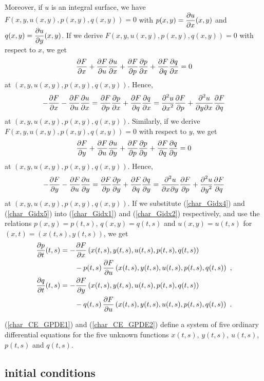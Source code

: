 Moreover, if $u$ is an integral surface, we have
$\displaystyle F\left(x,y,u(x,y),p(x,y),q(x,y)\right) = 0$ with
$\displaystyle p(x,y) = \pdydx{u}{x}(x,y)$ and
$\displaystyle q(x,y) = \pdydx{u}{y}(x,y)$.  If we derive
$\displaystyle F\left(x,y,u(x,y),p(x,y),q(x,y)\right) = 0$ 
with respect to $x$, we get
\[
\pdydx{F}{x} + \pdydx{F}{u}\pdydx{u}{x} + \pdydx{F}{p}\pdydx{p}{x}
+ \pdydx{F}{q} \pdydx{q}{x} = 0
\]
at $(x,y,u(x,y),p(x,y),q(x,y))$.  Hence,
\begin{equation} \label{char_Gidx4}
-\pdydx{F}{x} - \pdydx{F}{u}\pdydx{u}{x}
= \pdydx{F}{p}\pdydx{p}{x} + \pdydx{F}{q} \pdydx{q}{x}
= \pdydxn{u}{x}{2} \pdydx{F}{p} + \pdydxnm{u}{y}{x}{2}{}{} \pdydx{F}{q}
\end{equation}
at $(x,y,u(x,y),p(x,y),q(x,y))$.  Similarly, if we derive
$\displaystyle F\left(x,y,u(x,y),p(x,y),q(x,y)\right) = 0$
with respect to $y$, we get
\[
\pdydx{F}{y} + \pdydx{F}{u}\pdydx{u}{y} + \pdydx{F}{p}\pdydx{p}{y}
+ \pdydx{F}{q} \pdydx{q}{y} = 0
\]
at $(x,y,u(x,y),p(x,y),q(x,y))$.  Hence,
\begin{equation} \label{char_Gidx5}
-\pdydx{F}{y} - \pdydx{F}{u}\pdydx{u}{y}
= \pdydx{F}{p}\pdydx{p}{y} + \pdydx{F}{q} \pdydx{q}{y}
= \pdydxnm{u}{x}{y}{2}{}{} \pdydx{F}{p} + \pdydxn{u}{y}{2}
\pdydx{F}{q}
\end{equation}
at $(x,y,u(x,y),p(x,y),q(x,y))$.  If we substitute (\ref{char_Gidx4})
and (\ref{char_Gidx5}) into (\ref{char_Gidx1}) and (\ref{char_Gidx2})
respectively, and use the relations $p(x,y) = p(t,s)$,
$q(x,y) = q(t,s)$ and $u(x,y) = u(t,s)$ for $(x,t) = (x(t,s), y(t,s))$,
we get
\begin{equation} \label{char_CE_GPDE2}
\begin{split}
\pdydx{p}{t}(t,s)
&=-\pdydx{F}{x}\left(x(t,s),y(t,s),u(t,s),p(t,s),q(t,s)\right) \\
& \qquad - p(t,s) \,
\pdydx{F}{u}\left(x(t,s),y(t,s),u(t,s),p(t,s),q(t,s)\right) \ , \\
\pdydx{q}{t}(t,s)
&=-\pdydx{F}{y}\left(x(t,s),y(t,s),u(t,s),p(t,s),q(t,s)\right) \\
& \qquad - q(t,s)\,
\pdydx{F}{u}\left(x(t,s),y(t,s),u(t,s),p(t,s),q(t,s)\right) \ .
\end{split}
\end{equation}

(\ref{char_CE_GPDE1}) and (\ref{char_CE_GPDE2}) define a system of five
ordinary differential equations for the five unknown functions
$x(t,s)$, $y(t,s)$, $u(t,s)$, $p(t,s)$ and $q(t,s)$.

\subsection{initial conditions}

